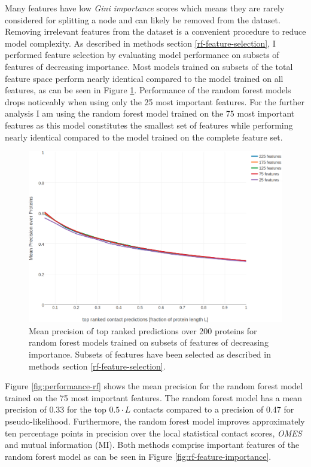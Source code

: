\documentclass[12pt,a4paper,twoside]{book}
\theoremstyle{definition}
\theoremstyle{definition}
\theoremstyle{remark}
\begin{document}
Many features have low \emph{Gini importance} scores which means they
are rarely considered for splitting a node and can likely be removed
from the dataset. Removing irrelevant features from the dataset is a
convenient procedure to reduce model complexity. As described in methods
section \ref{rf-feature-selection}, I performed feature selection by
evaluating model performance on subsets of features of decreasing
importance. Most models trained on subsets of the total feature space
perform nearly identical compared to the model trained on all features,
as can be seen in Figure \ref{fig:rf-feature-selection-performance}.
Performance of the random forest models drops noticeably when using only
the 25 most important features. For the further analysis I am using the
random forest model trained on the 75 most important features as this
model constitutes the smallest set of features while performing nearly
identical compared to the model trained on the complete feature set.







\begin{figure}
\includegraphics[width=1\linewidth]{img/random_forest_contact_prior/precision_vs_rank_featureselection_random_forest_optimized_hyperparameters} \caption{Mean precision of top
ranked predictions over 200 proteins for random forest models trained on
subsets of features of decreasing importance. Subsets of features have
been selected as described in methods section
\ref{rf-feature-selection}.}\label{fig:rf-feature-selection-performance}
\end{figure}

Figure \ref{fig:performance-rf} shows the mean precision for the random
forest model trained on the 75 most important features. The random
forest model has a mean precision of 0.33 for the top \(0.5\cdot L\)
contacts compared to a precision of 0.47 for pseudo-likelihood.
Furthermore, the random forest model improves approximately ten
percentage points in precision over the local statistical contact
scores, \emph{OMES} and mutual information (MI). Both methods comprise
important features of the random forest model as can be seen in Figure
\ref{fig:rf-feature-importance}.
\end{document}
